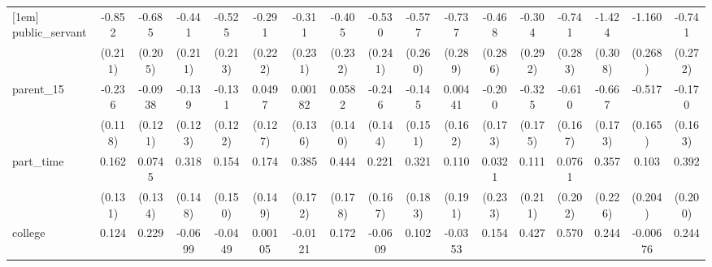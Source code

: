 {\begin{tabular}{l*{16}{c}}
[1em]
public\_servant      &      -0.852\sym{***}&      -0.685\sym{***}&      -0.441\sym{*}  &      -0.525\sym{*}  &      -0.291         &      -0.311         &      -0.405         &      -0.530\sym{*}  &      -0.577\sym{*}  &      -0.737\sym{*}  &      -0.468         &      -0.304         &      -0.741\sym{**} &      -1.424\sym{***}&      -1.160\sym{***}&      -0.741\sym{**} \\
                    &     (0.211)         &     (0.205)         &     (0.211)         &     (0.213)         &     (0.222)         &     (0.231)         &     (0.232)         &     (0.241)         &     (0.260)         &     (0.289)         &     (0.286)         &     (0.292)         &     (0.283)         &     (0.308)         &     (0.268)         &     (0.272)         \\
[1em]
parent\_15           &      -0.236\sym{*}  &     -0.0938         &      -0.139         &      -0.131         &      0.0497         &     0.00182         &      0.0582         &      -0.246         &      -0.145         &     0.00441         &      -0.200         &      -0.325         &      -0.610\sym{***}&      -0.667\sym{***}&      -0.517\sym{**} &      -0.170         \\
                    &     (0.118)         &     (0.121)         &     (0.123)         &     (0.122)         &     (0.127)         &     (0.136)         &     (0.140)         &     (0.144)         &     (0.151)         &     (0.162)         &     (0.173)         &     (0.175)         &     (0.167)         &     (0.173)         &     (0.165)         &     (0.163)         \\
[1em]
part\_time           &       0.162         &      0.0745         &       0.318\sym{*}  &       0.154         &       0.174         &       0.385\sym{*}  &       0.444\sym{*}  &       0.221         &       0.321         &       0.110         &      0.0321         &       0.111         &      0.0761         &       0.357         &       0.103         &       0.392\sym{*}  \\
                    &     (0.131)         &     (0.134)         &     (0.148)         &     (0.150)         &     (0.149)         &     (0.172)         &     (0.178)         &     (0.167)         &     (0.183)         &     (0.191)         &     (0.233)         &     (0.211)         &     (0.202)         &     (0.226)         &     (0.204)         &     (0.200)         \\
[1em]
college             &       0.124         &       0.229         &     -0.0699         &     -0.0449         &     0.00105         &     -0.0121         &       0.172         &     -0.0609         &       0.102         &     -0.0353         &       0.154         &       0.427\sym{*}  &       0.570\sym{**} &       0.244         &    -0.00676         &       0.244         \\

\end{tabular}}
